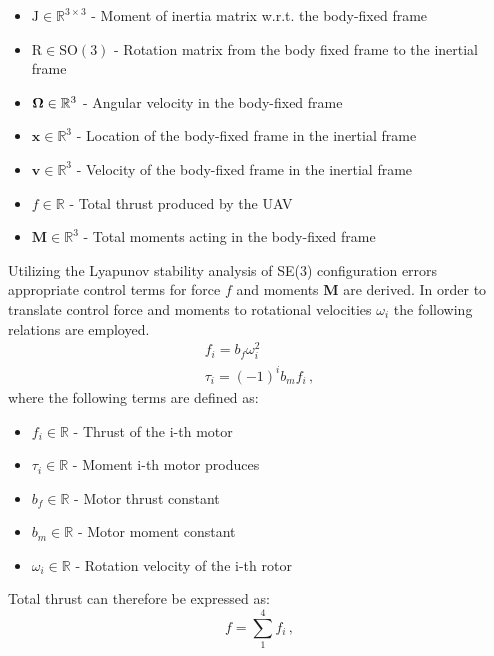 \begin{itemize}
	\item $\text{J} \in \mathbb{R}^{3 \times 3}$ - Moment of inertia matrix w.r.t. the body-fixed frame
	
	\item $\text{R} \in \text{SO}(3)$ - Rotation matrix from the body fixed frame to the inertial frame
	
	\item $\boldsymbol{\Omega} \in \mathbb{R}^3$ - Angular velocity in the body-fixed frame
	
	\item $\textbf{x} \in \mathbb{R}^3$ - Location of the body-fixed frame in the inertial frame
	
	\item $\textbf{v} \in \mathbb{R}^3$ - Velocity of the body-fixed frame in the inertial frame
	
	\item $f \in \mathbb{R}$ - Total thrust produced by the UAV
	
	\item $\textbf{M} \in \mathbb{R}^3$ - Total moments acting in the body-fixed frame
\end{itemize}

\noindent Utilizing the Lyapunov stability analysis of SE(3) configuration errors appropriate control terms for force $f$ and moments \textbf{M} are derived. In order to translate control force and moments to rotational velocities $\omega_i$ the following relations are employed.
\begin{gather}
f_i = b_f \omega_{i}^2 \label{force}\\
\tau_i = (-1)^i b_m f_i \, ,
\end{gather}
\noindent where the following terms are defined as:	
\begin{itemize}
	\item $f_i \in \mathbb{R}$ - Thrust of the i-th motor
	
	\item $\tau_i \in \mathbb{R}$ - Moment i-th motor produces
	
	\item $b_f \in \mathbb{R}$ - Motor thrust constant
	
	\item $b_m \in \mathbb{R}$ - Motor moment constant
	
	\item $\omega_i \in \mathbb{R}$ - Rotation velocity of the i-th rotor
\end{itemize}
Total thrust can therefore be expressed as:
\begin{equation}
f = \sum_{1}^{4}f_i \, , \label{control:f}
\end{equation}

